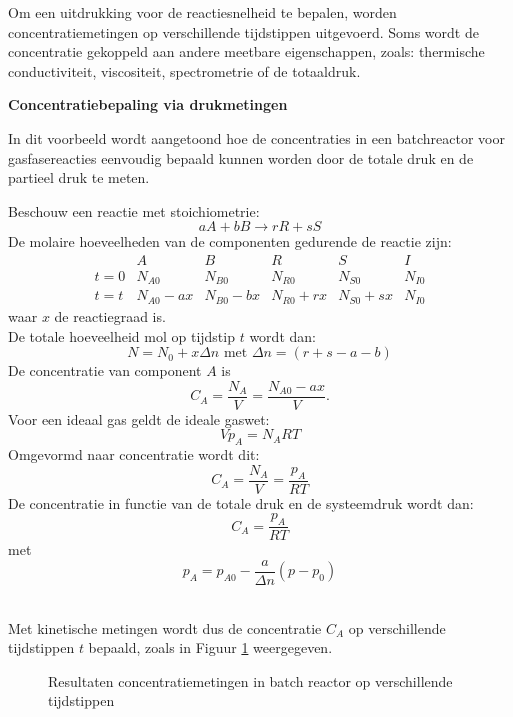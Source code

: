 \documentclass{ximera}
\begin{document}
Om een uitdrukking voor de reactiesnelheid te bepalen, worden concentratiemetingen op verschillende tijdstippen uitgevoerd. Soms wordt de concentratie gekoppeld aan andere meetbare eigenschappen, zoals: thermische conductiviteit, viscositeit, spectrometrie of de totaaldruk.

\begin{example} \textbf{Concentratiebepaling via drukmetingen}

In dit voorbeeld wordt aangetoond hoe de concentraties in een batchreactor voor gasfasereacties eenvoudig bepaald kunnen worden door de totale druk en de partieel druk te meten.

Beschouw een reactie met stoichiometrie:
\[
aA + bB \rightarrow rR + sS
\]
De molaire hoeveelheden van de componenten gedurende de reactie zijn:
\[
\begin{array}{c|ccccc}
 & A & B & R & S & I \\ \hline
t=0 & N_{A0} & N_{B0} & N_{R0} & N_{S0} & N_{I0} \\
t=t & N_{A0}-ax & N_{B0}-bx & N_{R0}+rx & N_{S0}+sx & N_{I0}
\end{array}
\]
waar $x$ de reactiegraad is.\\
De totale hoeveelheid mol op tijdstip $t$ wordt dan:
\[
N = N_0 + x \Delta n \text{   met   } \Delta n = (r + s - a - b)
\]
De concentratie van component $A$ is
\[
C_A = \frac{N_A}{V} = \frac{N_{A0} - ax}{V}.
\]
Voor een ideaal gas geldt de ideale gaswet: 
\[V p_A = N_A R T\]
Omgevormd naar concentratie wordt dit:
\[C_A = \frac{N_A}{V} = \frac{p_A}{RT}\]
De concentratie in functie van de totale druk en de systeemdruk wordt dan:
\[C_A = \frac{p_A}{RT} \] met 
\[p_A = p_{A0} - \frac{a}{\Delta n}(p-p_0)\]
\end{example}
\text{ } \\

Met kinetische metingen wordt dus de concentratie $C_A$ op verschillende tijdstippen $t$ bepaald, zoals in Figuur \ref{fig:kinetische metingen in batchreactoren} weergegeven.

\begin{figure}
    \centering
    \caption{Resultaten concentratiemetingen in batch reactor op verschillende tijdstippen}
    \label{fig:kinetische metingen in batchreactoren}
\end{figure}
\end{document}
